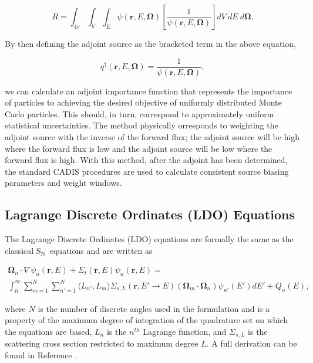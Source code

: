 \documentclass{article} %
\newcommand{\bo}{\mathbf\Omega}
\newcommand{\vecr}{\textbf{r}}
\newcommand{\sn}{S$_\mathrm{N}$}
\begin{document}
\begin{equation}
R = \int_{4\pi}\int_{V}\int_{E}\psi(\vecr,E,\bo)
\left[\frac{1}{\psi(\vecr,E,\bo)}\right]dV\ dE\ d\bo.
\end{equation}

\noindent By then defining the adjoint source as the bracketed term in the
above equation,

\begin{equation}
q^{\dagger}(\vecr,E,\bo) = \frac{1}{\psi(\vecr,E,\bo)},
\end{equation}

\noindent we can calculate an adjoint importance function that represents the
importance of particles to achieving the desired objective of uniformly
distributed Monte Carlo particles. This should, in turn, correspond to
approximately uniform statistical uncertainties. The method physically 
orresponds to weighting the adjoint source with the inverse of the forward
flux; the adjoint source will be high where the forward flux is low and the
adjoint source will be low where the forward flux is high. With this method,
after the adjoint has been determined, the standard CADIS procedures are used
to calculate consistent source biasing parameters and weight windows.

\subsection{Lagrange Discrete Ordinates (LDO) Equations}

The Lagrange Discrete Ordinates (LDO) equations are formally the same as the
classical \sn\ equations and are written as

\begin{multline}
\bo_n\cdot\nabla\psi_{n}(\vecr,E) + 
\Sigma_{t}(\vecr,E)\psi_{n}(\vecr,E) = \\
\int_0^\infty\sum_{m=1}^{N}\sum_{n'=1}^{N}\langle L_{n'},L_{m}\rangle
\Sigma_{s,L}(\vecr,E'\rightarrow E)(\bo_{m}\cdot\bo_n)\psi_{n'}(E')dE'
+ Q_{n}(E),
\end{multline}

\noindent where $N$ is the number of discrete angles used in the formulation
and is a property of the maximum degree of integration of the quadrature set
on which the equations are based, $L_n$ is the $n^{th}$ Lagrange function, and
$\Sigma_{s,L}$ is the scattering cross section restricted to maximum degree
$L$. A full derivation can be found in Reference \cite{ahrens}.
\end{document}
